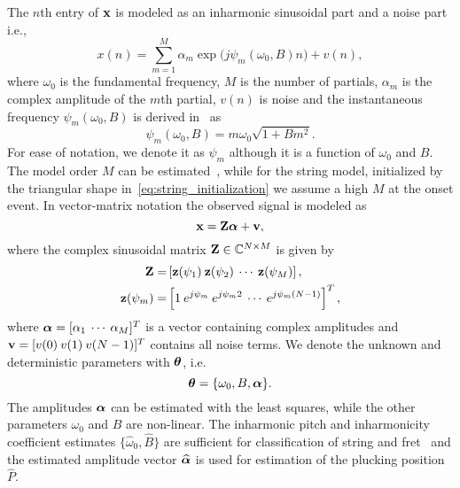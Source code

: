 The $n$th entry of $\mathbf x$ is modeled as an inharmonic sinusoidal part and a noise part i.e.,  
\begin{equation}\label{eq:sigmod1}
  x(n)\! =  \!\sum\limits_{m=1}^{M}\!\! \alpha_{m} \exp\big({j\psi_m(\omega_0,B) n}\big)+v(n), 
\end{equation}
where $\omega_0$ is the fundamental frequency, $M$ is the number of partials, $\alpha_{m}$ is the complex amplitude of the $m$th partial, $v(n)$ is noise and the instantaneous frequency  $\psi_m(\omega_0,B)$ is derived in~\cite{fletcher:piano_model} as
\begin{equation}
  \psi_m(\omega_0,B) = m \omega_0 \sqrt{1+B m^2}. 
\end{equation}
For ease of notation, we denote it as $\psi_m$ although it is a function of $\omega_0$ and $B$. The model order $M$ can be estimated~\cite{nielsen2017fast,multipitch}, while for the string model, initialized by the triangular shape in~\eqref{eq:string_initialization} we assume a high $M$ at the onset event. In vector-matrix notation the observed signal is modeled as
\begin{equation}\label{eq:xZa}
  \mathbf x = \mathbf{Z} \text{\boldmath$\alpha$} + \mathbf v,
\end{equation} 
where the complex sinusoidal matrix $\mathbf{Z} \in \mathbb{C}^{N\times M}$ is given by
\begin{align}
  \mathbf{Z} =& \left[ \mathbf z(\psi_1) \: \mathbf z(\psi_2) \: \cdots \: \mathbf z(\psi_M)\right], \\
  \mathbf z(\psi_m) =& \left[ 1 \: e^{j\psi_m} \: e^{j\psi_m2} \: \cdots \: e^{j\psi_m(N-1)} \right]^{T},
\end{align}
where $\text{\boldmath$\alpha$} = [\alpha_1 \: \cdots \: \alpha_M]^T$ is a vector containing complex amplitudes and $\mathbf v = [v(0) \: v(1) \: v(N-1)]^T$ contains all noise terms. We denote the unknown and deterministic parameters with $\text{\boldmath$\theta$}$, i.e.
\begin{equation}\label{eq:theta_parameters}
  \text{\boldmath$\theta$} = \{\omega_0, B, \text{\boldmath$\alpha$}\}.
\end{equation}
The amplitudes $\text{\boldmath$\alpha$}$ can be estimated with the least squares, while the other parameters $\omega_0$ and $B$ are non-linear. 
The inharmonic pitch and inharmonicity coefficient estimates $\{\widehat\omega_0, \widehat B \} $ are sufficient for classification of string and fret~\cite{barbancho:inharmonicity_tablature,michelson2018_aes} and the estimated amplitude vector $\text{\boldmath${\widehat\alpha}$}$ is used for estimation of the plucking position $\widehat{P}$.